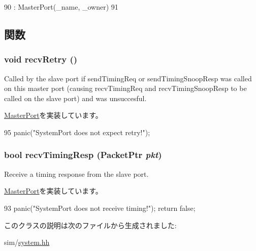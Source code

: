 \begin{DoxyCode}
90             : MasterPort(_name, _owner)
91         { }
\end{DoxyCode}


\subsection{関数}
\hypertarget{classSystem_1_1SystemPort_a29cb5a4f98063ce6e9210eacbdb35298}{
\subsubsection[{recvRetry}]{\setlength{\rightskip}{0pt plus 5cm}void recvRetry ()}}
\label{classSystem_1_1SystemPort_a29cb5a4f98063ce6e9210eacbdb35298}
Called by the slave port if sendTimingReq or sendTimingSnoopResp was called on this master port (causing recvTimingReq and recvTimingSnoopResp to be called on the slave port) and was unsuccesful. 

\hyperlink{classMasterPort_ac1ccc3bcf7ebabb20b57fab99b2be5b0}{MasterPort}を実装しています。


\begin{DoxyCode}
95         { panic("SystemPort does not expect retry!\n"); }
\end{DoxyCode}
\hypertarget{classSystem_1_1SystemPort_a482dba5588f4bee43e498875a61e5e0b}{
\subsubsection[{recvTimingResp}]{\setlength{\rightskip}{0pt plus 5cm}bool recvTimingResp ({\bf PacketPtr} {\em pkt})}}
\label{classSystem_1_1SystemPort_a482dba5588f4bee43e498875a61e5e0b}
Receive a timing response from the slave port. 

\hyperlink{classMasterPort_abd323548d6c93f8b0543f1fe3a86ca35}{MasterPort}を実装しています。


\begin{DoxyCode}
93         { panic("SystemPort does not receive timing!\n"); return false; }
\end{DoxyCode}


このクラスの説明は次のファイルから生成されました:\begin{DoxyCompactItemize}
\item 
sim/\hyperlink{sim_2system_8hh}{system.hh}\end{DoxyCompactItemize}
